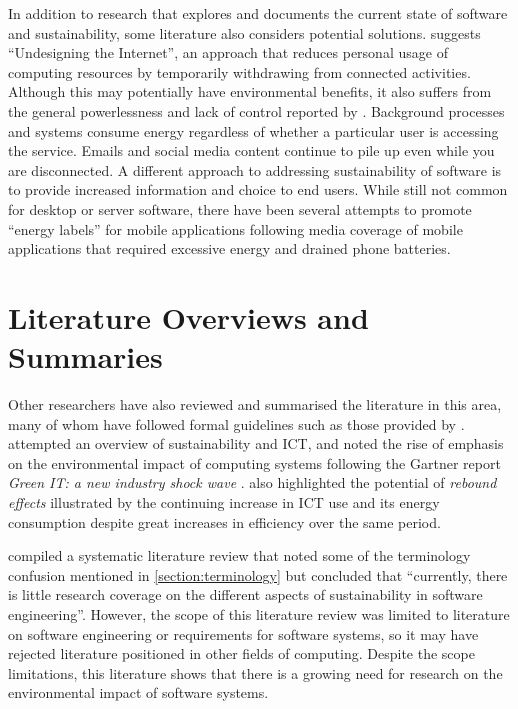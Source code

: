 In addition to research that explores and documents the current state of software and sustainability, some literature also considers potential solutions. \citet{Widdicks2018} suggests \enquote{Undesigning the Internet}, an approach that reduces personal usage of computing resources by temporarily withdrawing from connected activities. Although this may potentially have environmental benefits, it also suffers from the general powerlessness and lack of control reported by \citet{Tocze2022a}. Background processes and systems consume energy regardless of whether a particular user is accessing the service. Emails and social media content continue to pile up even while you are disconnected. A different approach to addressing sustainability of software is to provide increased information and choice to end users. While still not common for desktop or server software, there have been several attempts to promote \enquote{energy labels} for mobile applications \citep{Wilke2012} \citep{Baek2018} \citep{Behrouz2015} following media coverage of mobile applications that required excessive energy and drained phone batteries.

\section{Literature Overviews and Summaries}
\label{literature:summaries}

Other researchers have also reviewed and summarised the literature in this area, many of whom have followed formal guidelines such as those provided by \citet{Kitchenham2007}. \citet{Hilty2011} attempted an overview of sustainability and \gls{ICT}, and noted the rise of emphasis on the environmental impact of computing systems following the Gartner report \emph{Green IT: a new industry shock wave} \citep{Mingay2007}. \citeauthor{Hilty2011} also highlighted the potential of \emph{rebound effects} illustrated by the continuing increase in \gls{ICT} use and its energy consumption despite great increases in efficiency over the same period. 

\label{A62}
\citet{Penzenstadler2012} compiled a systematic literature review that noted some of the terminology confusion mentioned in \autoref{section:terminology} but concluded that \enquote{currently, there is little research coverage on the different aspects of sustainability in software engineering}. However, the scope of this literature review was limited to literature on software engineering or requirements for software systems, so it may have rejected literature positioned in other fields of computing.  Despite the scope limitations, this literature shows that there is a growing need for research on the environmental impact of software systems.

